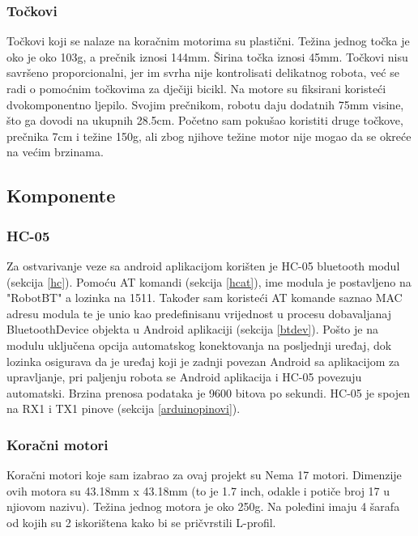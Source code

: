\documentclass[../Document.tex]{subfiles}
\begin{document}
\subsubsection{Točkovi}
Točkovi koji se nalaze na koračnim motorima su plastični. Težina jednog točka je oko je oko 103g, a prečnik iznosi 144mm. Širina točka iznosi 45mm. Točkovi nisu savršeno proporcionalni, jer im svrha nije kontrolisati delikatnog robota, već se radi o pomoćnim točkovima za dječiji bicikl. Na motore su fiksirani koristeći dvokomponentno ljepilo. Svojim prečnikom, robotu daju dodatnih 75mm visine, što ga dovodi na ukupnih 28.5cm. Početno sam pokušao koristiti druge točkove, prečnika 7cm i težine 150g, ali zbog njihove težine motor nije mogao da se okreće na većim brzinama.

\subsection{Komponente}

\subsubsection{HC-05}
Za ostvarivanje veze sa android aplikacijom korišten je HC-05 bluetooth modul (sekcija \ref{hc}). Pomoću AT komandi (sekcija \ref{hcat}), ime modula je postavljeno na "RobotBT" a lozinka na 1511. Također sam koristeći AT komande saznao MAC adresu modula te je unio kao predefinisanu vrijednost u procesu dobavaljanaj BluetoothDevice objekta u Android aplikaciji (sekcija \ref{btdev}). Pošto je na modulu uključena opcija automatskog konektovanja na posljednji uređaj, dok lozinka osigurava da je uređaj koji je zadnji povezan Android sa aplikacijom za upravljanje, pri paljenju robota se Android aplikacija i HC-05 povezuju automatski. Brzina prenosa podataka je 9600 bitova po sekundi. HC-05 je spojen na RX1 i TX1 pinove (sekcija \ref{arduinopinovi}).

\subsubsection{Koračni motori}
Koračni motori koje sam izabrao za ovaj projekt su Nema 17 motori. Dimenzije ovih motora su 43.18mm x 43.18mm  (to je 1.7 inch, odakle i potiče broj 17 u njiovom nazivu). Težina jednog motora je oko 250g. Na poleđini imaju 4 šarafa od kojih su 2 iskorištena kako bi se pričvrstili L-profil.

\end{document}
